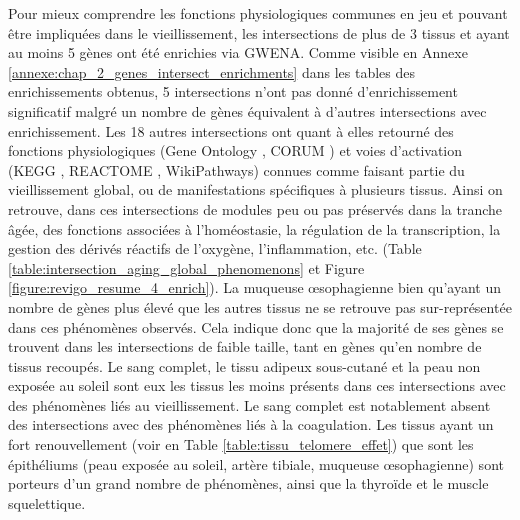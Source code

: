 Pour mieux comprendre les fonctions physiologiques communes en jeu et pouvant être impliquées dans le vieillissement, les intersections de plus de 3 tissus et ayant au moins 5 gènes ont été enrichies via GWENA. Comme visible en Annexe \ref{annexe:chap_2_genes_intersect_enrichments} dans les tables des enrichissements obtenus, 5 intersections n'ont pas donné d'enrichissement significatif malgré un nombre de gènes équivalent à d'autres intersections avec enrichissement. Les 18 autres intersections ont quant à elles retourné des fonctions physiologiques (Gene Ontology , CORUM ) et voies d'activation (KEGG , REACTOME , WikiPathways) connues comme faisant partie du vieillissement global, ou de manifestations spécifiques à plusieurs tissus. Ainsi on retrouve, dans ces intersections de modules peu ou pas préservés dans la tranche âgée, des fonctions associées à l'homéostasie, la régulation de la transcription, la gestion des dérivés réactifs de l'oxygène, l'inflammation, etc. (Table \ref{table:intersection_aging_global_phenomenons} et Figure \ref{figure:revigo_resume_4_enrich}). La muqueuse œsophagienne bien qu'ayant un nombre de gènes plus élevé que les autres tissus ne se retrouve pas sur-représentée dans ces phénomènes observés. Cela indique donc que la majorité de ses gènes se trouvent dans les intersections de faible taille, tant en gènes qu'en nombre de tissus recoupés. Le sang complet, le tissu adipeux sous-cutané et la peau non exposée au soleil sont eux les tissus les moins présents dans ces intersections avec des phénomènes liés au vieillissement. Le sang complet est notablement absent des intersections avec des phénomènes liés à la coagulation. Les tissus ayant un fort renouvellement (voir en Table \ref{table:tissu_telomere_effet}) que sont les épithéliums (peau exposée au soleil, artère tibiale, muqueuse œsophagienne) sont porteurs d'un grand nombre de phénomènes, ainsi que la thyroïde et le muscle squelettique. 


